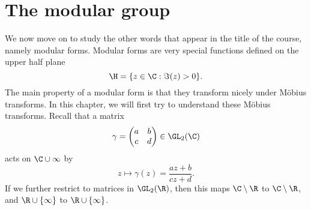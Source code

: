 \documentclass[a4paper]{article}
\begin{document}
\section{The modular group}
We now move on to study the other words that appear in the title of the course, namely modular forms. Modular forms are very special functions defined on the upper half plane
\[
  \H = \{z \in \C: \Im (z) > 0\}.
\]
The main property of a modular form is that they transform nicely under M\"obius transforms. In this chapter, we will first try to understand these M\"obius transforms. Recall that a matrix
\[
  \gamma =
  \begin{pmatrix}
    a & b\\
    c & d
  \end{pmatrix} \in \GL_2(\C)
\]
acts on $\C\cup \infty$ by
\[
  z \mapsto \gamma(z) = \frac{az + b}{cz + d}.
\]
If we further restrict to matrices in $\GL_2(\R)$, then this maps $\C \setminus \R$ to $\C \setminus \R$, and $\R \cup \{\infty\}$ to $\R \cup \{\infty\}$.
\end{document}
